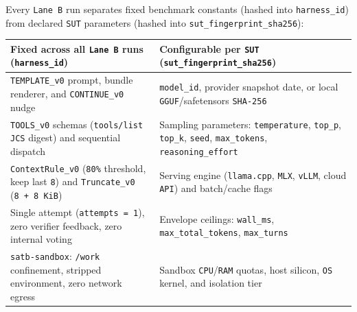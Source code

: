\documentclass[10pt,letterpaper]{article}
\begin{document}
Every \texttt{Lane\ B} run separates fixed benchmark constants (hashed
into \texttt{harness\_\allowbreak{}id}) from declared \texttt{SUT} parameters (hashed
into \texttt{sut\_\allowbreak{}fingerprint\_\allowbreak{}sha256}):

{\footnotesize\setlength{\tabcolsep}{3.8pt}\renewcommand{\arraystretch}{1.15}
\begin{longtable}[]{@{}
  >{\raggedright\arraybackslash}p{}
  >{\raggedright\arraybackslash}p{}@{}}
\toprule\noalign{}
\begin{minipage}[b]{\linewidth}\raggedright
\textbf{Fixed across all \texttt{Lane\ B} runs (\texttt{harness\_\allowbreak{}id})}
\end{minipage} & \begin{minipage}[b]{\linewidth}\raggedright
\textbf{Configurable per \texttt{SUT}
(\texttt{sut\_\allowbreak{}fingerprint\_\allowbreak{}sha256})}
\end{minipage} \\
\midrule\noalign{}
\endhead
\bottomrule\noalign{}
\endlastfoot
\texttt{TEMPLATE\_\allowbreak{}v0} prompt, bundle renderer, and \texttt{CONTINUE\_\allowbreak{}v0}
nudge & \texttt{model\_id}, provider snapshot date, or local
\texttt{GGUF}/\allowbreak{}safetensors \texttt{SHA-256} \\
\texttt{TOOLS\_v0} schemas (\texttt{tools/\allowbreak{}list} \texttt{JCS} digest) and
sequential dispatch & Sampling parameters: \texttt{temperature},
\texttt{top\_p}, \texttt{top\_k}, \texttt{seed}, \texttt{max\_\allowbreak{}tokens},
\texttt{reasoning\_\allowbreak{}effort} \\
\texttt{ContextRule\_\allowbreak{}v0} (\texttt{80\%} threshold, keep last \texttt{8})
and \texttt{Truncate\_\allowbreak{}v0} (\texttt{8\ +\ 8\ KiB}) & Serving engine
(\texttt{llama.cpp}, \texttt{MLX}, \texttt{vLLM}, cloud \texttt{API})
and batch/cache flags \\
Single attempt (\texttt{attempts\ =\ 1}), zero verifier feedback, zero
internal voting & Envelope ceilings: \texttt{wall\_ms},
\texttt{max\_\allowbreak{}total\_\allowbreak{}tokens}, \texttt{max\_\allowbreak{}turns} \\
\texttt{satb-\allowbreak{}sandbox}: \texttt{/work} confinement, stripped environment,
zero network egress & Sandbox \texttt{CPU}/\allowbreak{}\texttt{RAM} quotas, host
silicon, \texttt{OS} kernel, and isolation tier \\
\end{longtable}
}
\end{document}
